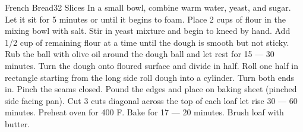 \documentclass[../main.tex]{subfiles}
\begin{document}
\begin{recipe}{French Bread}{32 Slices}{}
    In a small bowl, combine warm water, yeast,
    and sugar. Let it sit for 5 minutes or until
    it begins to foam.
    Place 2 cups of flour in the mixing bowl with salt.
    Stir in yeast mixture and begin to kneed by hand.
    Add 1/2 cup of remaining flour at a time until the
    dough is smooth but not sticky.
    Rub the ball with olive oil around the dough ball
    and let rest for 15 --- 30 minutes. Turn the dough
    onto floured surface and divide in half. Roll one
    half in rectangle starting from the long side roll
    dough into a cylinder. Turn both ends in. Pinch the
    seams closed. Pound the edges and place on baking sheet
    (pinched side facing pan). Cut 3 cuts diagonal across
    the top of each loaf let rise 30 --- 60 minutes. Preheat
    oven for 400\degrees{} F. Bake for 17 --- 20 minutes.
    Brush loaf with butter.
\end{recipe}
\end{document}

